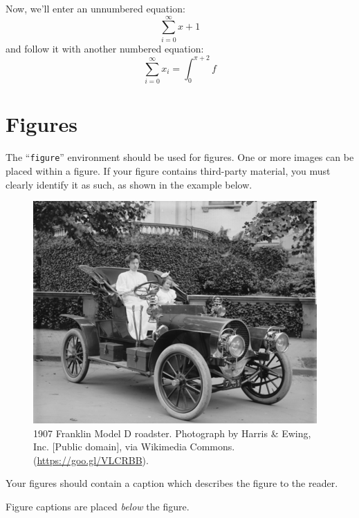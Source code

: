 \documentclass[sigconf,natbib=false]{acmart}
\begin{document}
Now, we'll enter an unnumbered equation:
\begin{displaymath}
  \sum_{i=0}^{\infty} x + 1
\end{displaymath}
and follow it with another numbered equation:
\begin{equation}
  \sum_{i=0}^{\infty}x_i=\int_{0}^{\pi+2} f
\end{equation}

\section{Figures}

The ``\verb|figure|'' environment should be used for figures. One or
more images can be placed within a figure. If your figure contains
third-party material, you must clearly identify it as such, as shown
in the example below.


\begin{figure}[h]
  \centering
  \includegraphics[width=\linewidth]{figs/sample-franklin}
  \caption{1907 Franklin Model D roadster. Photograph by Harris \&
    Ewing, Inc. [Public domain], via Wikimedia
    Commons. (\url{https://goo.gl/VLCRBB}).}
\end{figure}

Your figures should contain a caption which describes the figure to
the reader.

Figure captions are placed {\itshape below} the figure.
\end{document}

